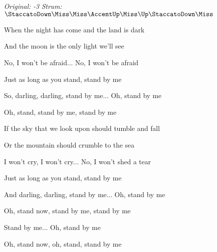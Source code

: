 \begin{song}


\begin{headerbox}
\RaiseBoxWithAccents
\textit{Original: -3} \quad
\textit{Strum:} $\StaccatoDown\Miss\Miss\AccentUp\Miss\Up\StaccatoDown\Miss$
\end{headerbox}

\begin{hchordbox}
\end{hchordbox}

\Large

\bigskip

\Intro {}     \par

\bigskip

When the night has come  and the land is dark \par
And the moon is the only light we'll see \par
No, I won't be afraid... No, I won't be afraid \par
Just as long as you stand, stand by me \par

\bigskip

So, darling, darling, stand by me... Oh, stand by me \par
Oh, stand,  stand by me,  stand by me \par


\bigskip

If the sky that we look upon  should tumble and fall \par
Or the mountain should crumble to the sea \par
I won't cry, I won't cry... No, I won't shed a tear \par
Just as long as you stand, stand by me \par

\bigskip

And darling, darling, stand by me... Oh, stand by me \par
Oh, stand now,  stand by me,  stand by me \par

\bigskip

 \par
{}Stand by me... Oh, stand by me \par
Oh, stand now, oh, stand, stand by me \par

\end{song}